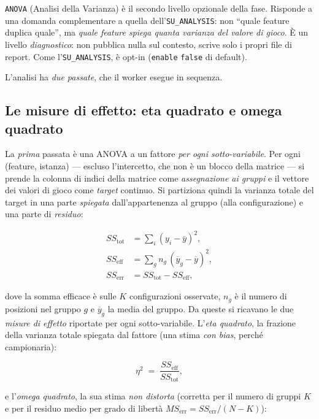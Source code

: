 \texttt{ANOVA} (Analisi della Varianza) è il secondo livello opzionale della
fase. Risponde a una domanda complementare a quella dell'\texttt{SU\_ANALYSIS}:
non ``quale feature duplica quale'', ma \emph{quale feature spiega quanta
varianza del valore di gioco}. È un livello \emph{diagnostico}: non pubblica
nulla sul contesto, scrive solo i propri file di report. Come
l'\texttt{SU\_ANALYSIS}, è opt-in (\texttt{enable} \texttt{false} di default).

L'analisi ha \emph{due passate}, che il worker esegue in sequenza.

\subsection{Le misure di effetto: eta quadrato e omega quadrato}

La \emph{prima} passata è una ANOVA a un fattore \emph{per ogni
sotto-variabile}. Per ogni (feature, istanza) — escluso l'intercetto, che non
è un blocco della matrice — si prende la colonna di indici della matrice come
\emph{assegnazione ai gruppi} e il vettore dei valori di gioco come \emph{target}
continuo. Si partiziona quindi la varianza totale del target in una parte
\emph{spiegata} dall'appartenenza al gruppo (alla configurazione) e una parte
di \emph{residuo}:

\begin{align}
  SS_{\text{tot}} &= \sum_{i} (y_i - \overline{y})^2, \\
  SS_{\text{eff}} &= \sum_{g} n_g\,(\overline{y}_g - \overline{y})^2, \\
  SS_{\text{err}} &= SS_{\text{tot}} - SS_{\text{eff}},
\end{align}

dove la somma efficace è sulle $K$ configurazioni osservate, $n_g$ è il numero
di posizioni nel gruppo $g$ e $\overline{y}_g$ la media del gruppo. Da queste si
ricavano le due \emph{misure di effetto} riportate per ogni sotto-variabile.
L'\emph{eta quadrato}, la frazione della varianza totale spiegata dal fattore
(una stima \emph{con bias}, perché campionaria):

\begin{equation}
  \eta^2 \;=\; \frac{SS_{\text{eff}}}{SS_{\text{tot}}},
  \label{eq:eta2}
\end{equation}

e l'\emph{omega quadrato}, la sua stima \emph{non distorta} (corretta per il
numero di gruppi $K$ e per il residuo medio per grado di libertà
$MS_{\text{err}} = SS_{\text{err}}/(N-K)$):


